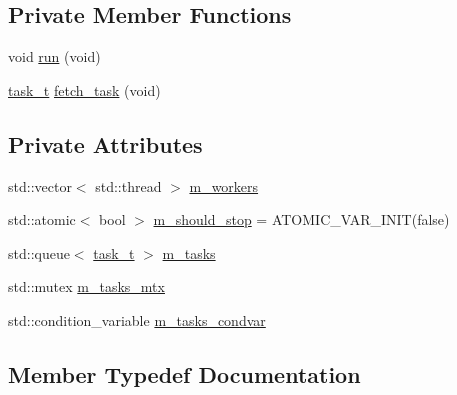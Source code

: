 \subsection*{Private Member Functions}
\begin{DoxyCompactItemize}
\item 
void \hyperlink{classtacopie_1_1utils_1_1thread__pool_a6e4ae0994faf97d0d260c1f846ff4639}{run} (void)
\item 
\hyperlink{classtacopie_1_1utils_1_1thread__pool_a8ae8886fdeaa8e5c0abad12626a47296}{task\+\_\+t} \hyperlink{classtacopie_1_1utils_1_1thread__pool_a182472a7727edc7d37d2309ccbc2dea7}{fetch\+\_\+task} (void)
\end{DoxyCompactItemize}
\subsection*{Private Attributes}
\begin{DoxyCompactItemize}
\item 
std\+::vector$<$ std\+::thread $>$ \hyperlink{classtacopie_1_1utils_1_1thread__pool_a5250ed4fbe845c69e3e28cb7edf4d796}{m\+\_\+workers}
\item 
std\+::atomic$<$ bool $>$ \hyperlink{classtacopie_1_1utils_1_1thread__pool_a1463eb81724978e4c694b8409528b00a}{m\+\_\+should\+\_\+stop} = A\+T\+O\+M\+I\+C\+\_\+\+V\+A\+R\+\_\+\+I\+N\+IT(false)
\item 
std\+::queue$<$ \hyperlink{classtacopie_1_1utils_1_1thread__pool_a8ae8886fdeaa8e5c0abad12626a47296}{task\+\_\+t} $>$ \hyperlink{classtacopie_1_1utils_1_1thread__pool_ad00580e9ab77e128cffaf35d80223291}{m\+\_\+tasks}
\item 
std\+::mutex \hyperlink{classtacopie_1_1utils_1_1thread__pool_aeae956282edc4d2171ee2e408cb1189f}{m\+\_\+tasks\+\_\+mtx}
\item 
std\+::condition\+\_\+variable \hyperlink{classtacopie_1_1utils_1_1thread__pool_a6f5122cc6ef6429fdb778a6e6c37216b}{m\+\_\+tasks\+\_\+condvar}
\end{DoxyCompactItemize}


\subsection{Member Typedef Documentation}
\mbox{\label{classtacopie_1_1utils_1_1thread__pool_a8ae8886fdeaa8e5c0abad12626a47296}} 
